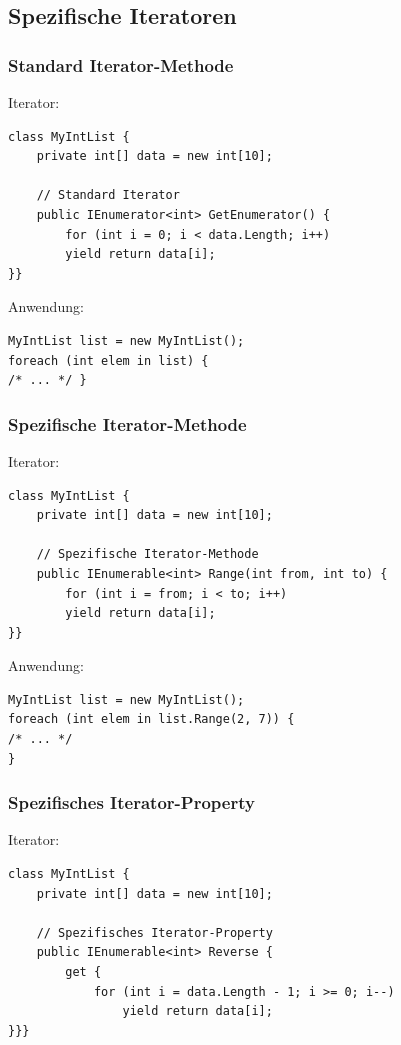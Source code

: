 \subsection{Spezifische Iteratoren}
\subsubsection{Standard Iterator-Methode}
Iterator:
\begin{lstlisting}
class MyIntList {
    private int[] data = new int[10];

    // Standard Iterator
    public IEnumerator<int> GetEnumerator() {
        for (int i = 0; i < data.Length; i++)
        yield return data[i];
}}
\end{lstlisting}

Anwendung:
\begin{lstlisting}
MyIntList list = new MyIntList();
foreach (int elem in list) {
/* ... */ }
\end{lstlisting}


\subsubsection{Spezifische Iterator-Methode}
Iterator:
\begin{lstlisting}
class MyIntList {
    private int[] data = new int[10];

    // Spezifische Iterator-Methode
    public IEnumerable<int> Range(int from, int to) {
        for (int i = from; i < to; i++)
        yield return data[i];
}}
\end{lstlisting}

Anwendung:
\begin{lstlisting}
MyIntList list = new MyIntList();
foreach (int elem in list.Range(2, 7)) {
/* ... */
}
\end{lstlisting}


\subsubsection{Spezifisches Iterator-Property}
Iterator:
\begin{lstlisting}
class MyIntList {
    private int[] data = new int[10];

    // Spezifisches Iterator-Property
    public IEnumerable<int> Reverse {
        get {
            for (int i = data.Length - 1; i >= 0; i--)
                yield return data[i];
}}}
\end{lstlisting}


